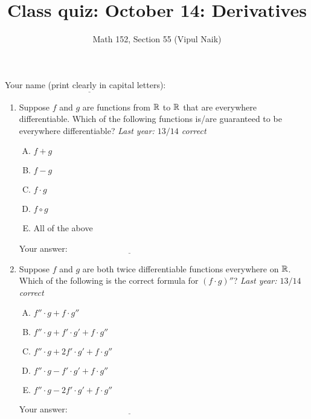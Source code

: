 \documentclass[10pt]{amsart}
\title{Class quiz: October 14: Derivatives}
\author{Math 152, Section 55 (Vipul Naik)}
\begin{document}
\maketitle

Your name (print clearly in capital letters): $\underline{\qquad\qquad\qquad\qquad\qquad\qquad\qquad\qquad\qquad\qquad}$

\begin{enumerate}

\item Suppose $f$ and $g$ are functions from $\mathbb{R}$ to $\mathbb{R}$ that are
  everywhere differentiable. Which of the following functions is/are
  guaranteed to be everywhere differentiable? {\em Last year: $13/14$
  correct}

  \begin{enumerate}[(A)]

  \item $f + g$
  \item $f - g$
  \item $f \cdot g$
  \item $f \circ g$
  \item All of the above
  \end{enumerate}

  \vspace{0.1in}
  Your answer: $\underline{\qquad\qquad\qquad\qquad\qquad\qquad\qquad}$
  \vspace{1.5in}

\item Suppose $f$ and $g$ are both twice differentiable functions
  everywhere on $\mathbb{R}$. Which of the following is the correct formula
  for $(f \cdot g)''$? {\em Last year: $13/14$ correct}

  \begin{enumerate}[(A)]
  \item $f'' \cdot g + f \cdot g''$
  \item $f'' \cdot g + f' \cdot g' + f \cdot g''$
  \item $f'' \cdot g + 2f' \cdot g' + f \cdot g''$
  \item $f'' \cdot g - f' \cdot g' + f \cdot g''$
  \item $f'' \cdot g - 2f' \cdot g' + f \cdot g''$
  \end{enumerate}

  \vspace{0.1in}
  Your answer: $\underline{\qquad\qquad\qquad\qquad\qquad\qquad\qquad}$
  \vspace{1.5in}


\end{enumerate}
\end{document}
